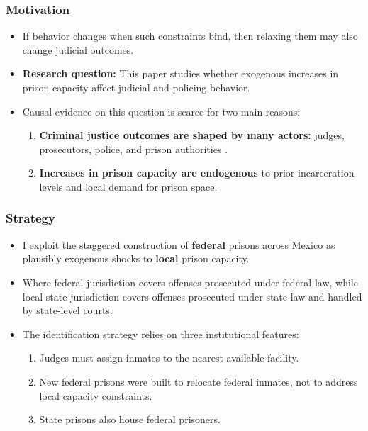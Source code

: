 \documentclass[10pt,aspectratio=169]{beamer}
\begin{document}
\begin{frame}
\frametitle{Motivation}

\small

\begin{itemize}\setlength\itemsep{0.65em}
    
    \item If behavior changes when such constraints bind, then relaxing them may also change judicial outcomes.
    \pause
    \item \textbf{Research question:} This paper studies whether exogenous increases in prison capacity affect judicial and policing behavior.
    \pause

    \item Causal evidence on this question is scarce for two main reasons:
    \begin{enumerate}\setlength\itemsep{0.65em}
        \item \textbf{Criminal justice outcomes are shaped by many actors:} judges, prosecutors, police, and prison authorities {\footnotesize\color{gray}\citep{Ater-Police-Org-JPE}.}
        \pause
        \item \textbf{Increases in prison capacity are endogenous} to prior incarceration levels and local demand for prison space.
    \end{enumerate}

    \end{itemize}

\end{frame}


\begin{frame}
\frametitle{Strategy}
\small

\begin{itemize}\setlength\itemsep{0.65em}
    \item I exploit the staggered construction of \textbf{federal} prisons across Mexico as plausibly exogenous shocks to \textbf{local} prison capacity.
    \pause
    \item Where federal jurisdiction covers offenses prosecuted under federal law, while local state jurisdiction covers offenses prosecuted under state law and handled by state-level courts.
    \pause
    \item The identification strategy relies on three institutional features:
    \begin{enumerate}\setlength\itemsep{0.65em}
        \item Judges must assign inmates to the nearest available facility.
        \pause
        \item New federal prisons were built to relocate federal inmates, not to address local capacity constraints.
        \pause
        \item State prisons also house federal prisoners.
    \end{enumerate}
\end{itemize}
\end{frame}
\end{document}
